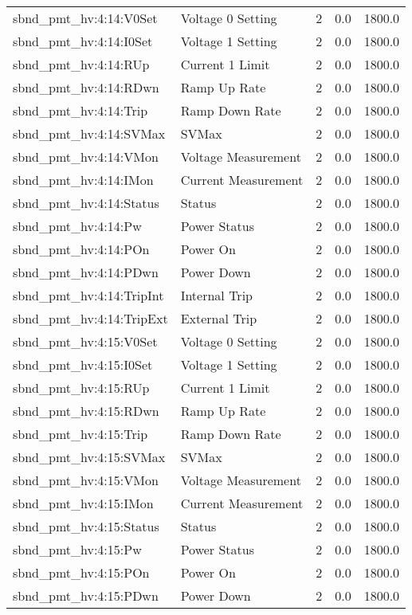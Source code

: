 \begin{center}
\begin{longtable}{l | l l l l }
sbnd\_pmt\_hv:4:14:V0Set & Voltage 0 Setting & 2 & 0.0 & 1800.0\\ 
sbnd\_pmt\_hv:4:14:I0Set & Voltage 1 Setting & 2 & 0.0 & 1800.0\\ 
sbnd\_pmt\_hv:4:14:RUp & Current 1 Limit & 2 & 0.0 & 1800.0\\ 
sbnd\_pmt\_hv:4:14:RDwn & Ramp Up Rate & 2 & 0.0 & 1800.0\\ 
sbnd\_pmt\_hv:4:14:Trip & Ramp Down Rate & 2 & 0.0 & 1800.0\\ 
sbnd\_pmt\_hv:4:14:SVMax & SVMax & 2 & 0.0 & 1800.0\\ 
sbnd\_pmt\_hv:4:14:VMon & Voltage Measurement & 2 & 0.0 & 1800.0\\ 
sbnd\_pmt\_hv:4:14:IMon & Current Measurement & 2 & 0.0 & 1800.0\\ 
sbnd\_pmt\_hv:4:14:Status & Status & 2 & 0.0 & 1800.0\\ 
sbnd\_pmt\_hv:4:14:Pw & Power Status & 2 & 0.0 & 1800.0\\ 
sbnd\_pmt\_hv:4:14:POn & Power On & 2 & 0.0 & 1800.0\\ 
sbnd\_pmt\_hv:4:14:PDwn & Power Down & 2 & 0.0 & 1800.0\\ 
sbnd\_pmt\_hv:4:14:TripInt & Internal Trip & 2 & 0.0 & 1800.0\\ 
sbnd\_pmt\_hv:4:14:TripExt & External Trip & 2 & 0.0 & 1800.0\\ 
sbnd\_pmt\_hv:4:15:V0Set & Voltage 0 Setting & 2 & 0.0 & 1800.0\\ 
sbnd\_pmt\_hv:4:15:I0Set & Voltage 1 Setting & 2 & 0.0 & 1800.0\\ 
sbnd\_pmt\_hv:4:15:RUp & Current 1 Limit & 2 & 0.0 & 1800.0\\ 
sbnd\_pmt\_hv:4:15:RDwn & Ramp Up Rate & 2 & 0.0 & 1800.0\\ 
sbnd\_pmt\_hv:4:15:Trip & Ramp Down Rate & 2 & 0.0 & 1800.0\\ 
sbnd\_pmt\_hv:4:15:SVMax & SVMax & 2 & 0.0 & 1800.0\\ 
sbnd\_pmt\_hv:4:15:VMon & Voltage Measurement & 2 & 0.0 & 1800.0\\ 
sbnd\_pmt\_hv:4:15:IMon & Current Measurement & 2 & 0.0 & 1800.0\\ 
sbnd\_pmt\_hv:4:15:Status & Status & 2 & 0.0 & 1800.0\\ 
sbnd\_pmt\_hv:4:15:Pw & Power Status & 2 & 0.0 & 1800.0\\ 
sbnd\_pmt\_hv:4:15:POn & Power On & 2 & 0.0 & 1800.0\\ 
sbnd\_pmt\_hv:4:15:PDwn & Power Down & 2 & 0.0 & 1800.0\\ 

\end{longtable}
\end{center}
